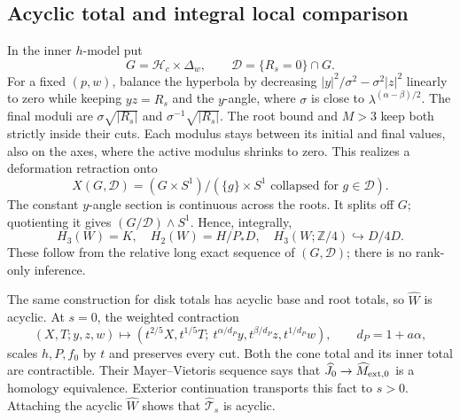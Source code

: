 \documentclass[11pt]{article}
\newcommand{\Z}{\mathbb Z}
\newcommand{\calH}{\mathcal H}
\newcommand{\calD}{\mathcal D}
\begin{document}
\subsection{Acyclic total and integral local comparison}

In the inner \(h\)-model put
\[
 G=\calH_c\times\Delta_w,\qquad
 \calD=\{R_s=0\}\cap G .
\]
For a fixed \((p,w)\), balance the hyperbola by decreasing
\(|y|^2/\sigma^2-\sigma^2|z|^2\) linearly to zero while
keeping \(yz=R_s\) and the \(y\)-angle, where
\(\sigma\) is close to \(\lambda^{(\alpha-\beta)/2}\).
The final moduli are \(\sigma\sqrt{|R_s|}\) and
\(\sigma^{-1}\sqrt{|R_s|}\). The root bound and \(M>3\)
keep both strictly inside their cuts. Each modulus stays
between its initial and final values, also on the axes,
where the active modulus shrinks to zero.
This realizes a deformation retraction onto
\[
 X(G,\calD)=(G\times S^1)/
        (\{g\}\times S^1\text{ collapsed for }g\in\calD).
                                                                    \tag{20}
\]
The constant \(y\)-angle section is continuous across the roots.
It splits off \(G\); quotienting it gives
\((G/\calD)\wedge S^1\). Hence, integrally,
\[
 H_3(W)=K,\quad H_2(W)=H/P_*D,\quad
 H_3(W;\Z/4)\hookrightarrow D/4D.                  \tag{21}
\]
These follow from the relative long exact sequence of \((G,\calD)\);
there is no rank-only inference.

The same construction for disk totals has acyclic base and root
totals, so \(\widehat W\) is acyclic.
At \(s=0\), the weighted contraction
\[
 (X,T;y,z,w)\longmapsto
 (t^{2/5}X,t^{1/5}T;\
 t^{\alpha/d_P}y,t^{\beta/d_P}z,t^{1/d_P}w),
 \qquad d_P=1+a\alpha,                              \tag{22}
\]
scales \(h,P,f_0\) by \(t\) and preserves every cut.
Both the cone total and its inner total are contractible.
Their Mayer--Vietoris sequence says that
\(\widehat J_0\to\widehat M_{{\rm ext},0}\) is a homology
equivalence. Exterior continuation transports this fact to \(s>0\).
Attaching the acyclic \(\widehat W\) shows that
\(\widehat{\mathcal T}_s\) is acyclic.
\end{document}
